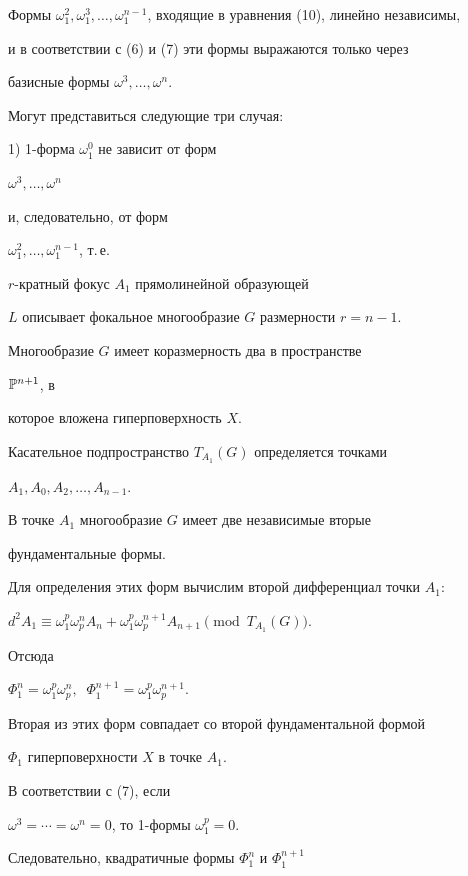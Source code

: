 Формы $\omega_1^2, \omega_1^3, \dotsc ,


\omega_1^{n-1}$, входящие в уравнения (10), линейно независимы,


и в соответствии с (6) и (7) эти формы выражаются только через


базисные формы  $\omega^3, \dotsc, \omega^n$.


Могут представиться следующие три случая:





1) 1-форма $\omega_1^0$ не зависит от форм


$\omega^3, \dotsc, \omega^n$


и, следовательно, от форм


$\omega_1^2, \dotsc, \omega_1^{n-1}$, т.\,е.


$r$-кратный фокус $A_1$ прямолинейной образующей


$L$ описывает фокальное многообразие $G$ размерности $r = n - 1$.


Многообразие $G$ имеет коразмерность два в пространстве


${\Bbb P}^{n+1}$, в


которое вложена гиперповерхность $X$.


Касательное подпространство $T_{A_1}(G)$ определяется точками


$A_1, A_0, A_2, \dotsc , A_{n-1}$.


В точке $A_1$ многообразие $G$ имеет две независимые вторые


фундаментальные формы.


Для определения этих форм вычислим второй дифференциал точки $A_1$:


$d^2 A_1 \equiv \omega_1^p \omega_p^n A_n +  \omega_1^p


\omega_p^{n+1} A_{n+1} \pmod{T_{A_1}(G)}$.


Отсюда


$\Phi_1^n = \omega_1^p \omega_p^n, \;\; \Phi_1^{n+1} = \omega_1^p


\omega_p^{n+1}$.


Вторая из этих форм совпадает со второй фундаментальной формой


$\Phi_1$ гиперповерхности $X$ в точке $A_1$.


В соответствии с (7), если


$\omega^3 = \dotsb = \omega^n = 0$, то 1-формы $\omega_1^p = 0$.


Следовательно, квадратичные формы $\Phi_1^{n}$ и $\Phi_1^{n+1}$


